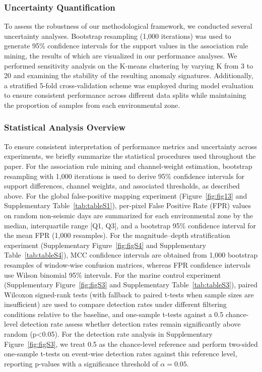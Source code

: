 \documentclass[preprint,review,12pt,authoryear]{elsarticle}
\begin{document}
\subsubsection{Uncertainty Quantification}\label{sec:uncertainty}
To assess the robustness of our methodological framework, we conducted several uncertainty analyses. Bootstrap resampling (1,000 iterations) was used to generate 95\% confidence intervals for the support values in the association rule mining, the results of which are visualized in our performance analyses. We performed sensitivity analysis on the K-means clustering by varying K from 3 to 20 and examining the stability of the resulting anomaly signatures. Additionally, a stratified 5-fold cross-validation scheme was employed during model evaluation to ensure consistent performance across different data splits while maintaining the proportion of samples from each environmental zone.

\subsubsection{Statistical Analysis Overview}
To ensure consistent interpretation of performance metrics and uncertainty across experiments, we briefly summarize the statistical procedures used throughout the paper. For the association rule mining and channel-weight estimation, bootstrap resampling with 1,000 iterations is used to derive 95\% confidence intervals for support differences, channel weights, and associated thresholds, as described above. For the global false-positive mapping experiment (Figure~\ref{fig:fig13} and Supplementary Table~\ref{tab:tableS1}), per-pixel False Positive Rate (FPR) values on random non-seismic days are summarized for each environmental zone by the median, interquartile range [Q1, Q3], and a bootstrap 95\% confidence interval for the mean FPR (1,000 resamples). For the magnitude--depth stratification experiment (Supplementary Figure~\ref{fig:figS4} and Supplementary Table~\ref{tab:tableS4}), MCC confidence intervals are obtained from 1,000 bootstrap resamples of window-wise confusion matrices, whereas FPR confidence intervals use Wilson binomial 95\% intervals. For the marine control experiment (Supplementary Figure~\ref{fig:figS3} and Supplementary Table~\ref{tab:tableS3}), paired Wilcoxon signed-rank tests (with fallback to paired t-tests when sample sizes are insufficient) are used to compare detection rates under different filtering conditions relative to the baseline, and one-sample t-tests against a 0.5 chance-level detection rate assess whether detection rates remain significantly above random (p<0.05). For the detection rate analysis in Supplementary Figure~\ref{fig:figS3}, we treat 0.5 as the chance-level reference and perform two-sided one-sample t-tests on event-wise detection rates against this reference level, reporting p-values with a significance threshold of $\alpha = 0.05$.
\end{document}
